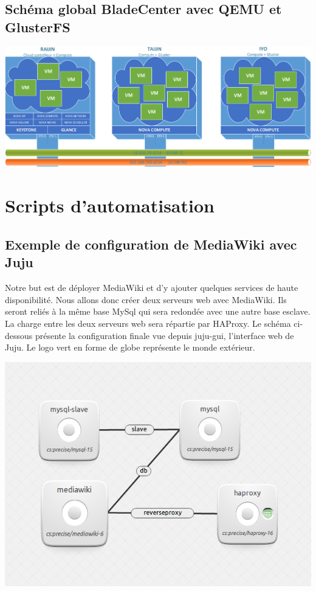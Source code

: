 \documentclass[a4paper,oneside]{report}
\begin{document}
\section{Schéma global BladeCenter avec QEMU et GlusterFS} \label{schema:centos}

\begin{center}
\includegraphics[scale=0.8,angle=90]{images/SchemaBladeQemuGlut-crop.pdf}
\end{center}

\chapter{Scripts d'automatisation}
\section{Exemple de configuration de MediaWiki avec Juju} \label{auto:juju}

Notre but est de déployer MediaWiki et d'y ajouter quelques services de haute disponibilité. Nous allons donc créer deux serveurs web avec MediaWiki. Ils seront reliés à la même base MySql qui sera redondée avec une autre base esclave. La charge entre les deux serveurs web sera répartie par HAProxy. Le schéma ci-dessous présente la configuration finale vue depuis juju-gui, l'interface web de Juju. Le logo vert en forme de globe représente le monde extérieur.
\begin{center}
\includegraphics[scale=0.75]{images/butJuju.png}
\end{center}
\end{document}
